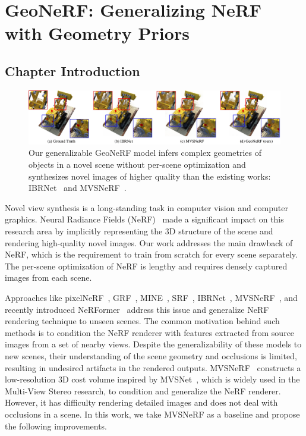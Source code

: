 \chapter{GeoNeRF: Generalizing NeRF with Geometry Priors}

\section{Chapter Introduction} \label{sec:chapter3}

\begin{figure}[t]
    \begin{center}
        \includegraphics[width=1.0\linewidth]{images/chapter3/figures/intro.jpg}
    \end{center}
   \caption{Our generalizable GeoNeRF model infers complex geometries of objects in a novel scene without per-scene optimization and synthesizes novel images of higher quality than the existing works: IBRNet~\cite{wang2021ibrnet} and MVSNeRF~\cite{chen2021mvsnerf}.}
\end{figure}

Novel view synthesis is a long-standing task in computer vision and computer graphics. Neural Radiance Fields (NeRF)~\cite{mildenhall2020nerf} made a significant impact on this research area by implicitly representing the 3D structure of the scene and rendering high-quality novel images. Our work addresses the main drawback of NeRF, which is the requirement to train from scratch for every scene separately. The per-scene optimization of NeRF is lengthy and requires densely captured images from each scene.

Approaches like pixelNeRF~\cite{yu2021pixelnerf}, GRF~\cite{trevithick2021grf}, MINE~\cite{li2021mine}, SRF~\cite{chibane2021stereo}, IBRNet~\cite{wang2021ibrnet}, MVSNeRF~\cite{chen2021mvsnerf}, and recently introduced NeRFormer~\cite{reizenstein2021common} address this issue and generalize NeRF rendering technique to unseen scenes. The common motivation behind such methods is to condition the NeRF renderer with features extracted from source images from a set of nearby views. Despite the generalizability of these models to new scenes, their understanding of the scene geometry and occlusions is limited, resulting in undesired artifacts in the rendered outputs. MVSNeRF~\cite{chen2021mvsnerf} constructs a low-resolution 3D cost volume inspired by MVSNet~\cite{yao2018mvsnet}, which is widely used in the Multi-View Stereo research, to condition and generalize the NeRF renderer. However, it has difficulty rendering detailed images and does not deal with occlusions in a scene. In this work, we take MVSNeRF as a baseline and propose the following improvements.

